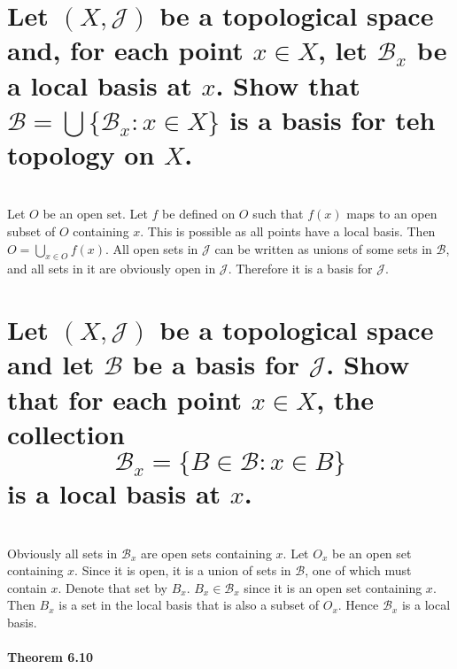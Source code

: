 \begin{parts}
 \part{Let $(X, \mathcal{J})$ be a topological space and, for each point $x \in X$, let $\mathcal{B}_x$ be a local basis at $x$. Show that $\mathcal{B} = \bigcup \{\mathcal{B}_x:x \in X\}$ is a basis for teh topology on $X$.}
 
\begin{solution}
\\ Let $O$ be an open set. Let $f$ be defined on $O$ such that $f(x)$ maps to an open subset of $O$ containing $x$. This is possible as all points have a local basis. Then $O = \bigcup_{x \in O} f(x)$. All open sets in $\mathcal{J}$ can be written as unions of some sets in $\mathcal{B}$, and all sets in it are obviously open in $\mathcal{J}$. Therefore it is a basis for $\mathcal{J}$.
 \end{solution}
 
 \part{Let $(X, \mathcal{J})$ be a topological space and let $\mathcal{B}$ be a basis for $\mathcal{J}$. Show that for each point $x \in X$, the collection $$\mathcal{B}_x = \{B \in \mathcal{B}: x \in B\}$$ is a local basis at $x$.}
 
\begin{solution}
 \\Obviously all sets in $\mathcal{B}_x$ are open sets containing $x$. Let $O_x$ be an open set containing $x$. Since it is open, it is a union of sets in $\mathcal{B}$, one of which must contain $x$. Denote that set by $B_x$. $B_x \in \mathcal{B}_x$ since it is an open set containing $x$. Then $B_x$ is a set in the local basis that is also a subset of $O_x$. Hence $\mathcal{B}_x$ is a local basis.
\end{solution}
 \end{parts}
 
 \subsection{Theorem 6.10}
 \setcounter{question}{0}
 
 
